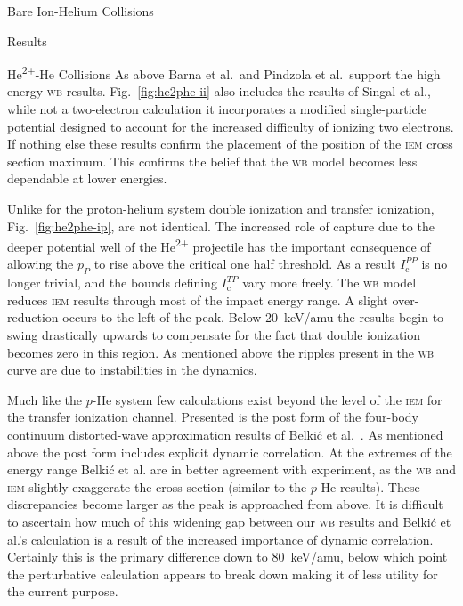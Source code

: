 \documentclass[letterpaper, 11 pt]{report}
\begin{document}
\begin{chapter}{Bare Ion-Helium Collisions \label{chap:p-he2p-he}}
\begin{section}{Results \label{sec:phe2p-res}}
\begin{subsection}{\texorpdfstring{He\textsuperscript{2+}}{He2+}-He Collisions
                         \label{sec:he2phe-res}}
         As above Barna et al.\ and Pindzola et al.\ support the high energy \textsc{wb}
         results. Fig.~\ref{fig:he2phe-ii} also includes the results of Singal et al., while
         not a two-electron calculation it incorporates a modified single-particle potential designed to
         account for the increased difficulty of ionizing two electrons. If nothing else these results
         confirm the placement of the position of the \textsc{iem} cross section maximum. This confirms
         the belief that the \textsc{wb} model becomes less dependable at lower energies.

         Unlike for the proton-helium system double ionization and transfer ionization,
         Fig.~\ref{fig:he2phe-ip}, are not identical. The increased role of capture due to the deeper
         potential well of the He\textsuperscript{2+} projectile has the important consequence of
         allowing the $p_P$ to rise above the critical one half threshold. As a result
         $I^{PP}_\mathrm{c}$ is no longer trivial, and the bounds defining $I^{TP}_\mathrm{c}$ vary more
         freely. The \textsc{wb} model reduces \textsc{iem} results through most of the impact energy
         range. A slight over-reduction occurs to the left of the peak. Below 20~keV/amu the results
         begin to swing drastically upwards to compensate for the fact that double ionization becomes
         zero in this region. As mentioned above the ripples present in the \textsc{wb} curve are due to
         instabilities in the dynamics.

         Much like the $p$-He system few calculations exist beyond the level of the \textsc{iem} for the
         transfer ionization channel. Presented is the post form of the four-body continuum
         distorted-wave  approximation results of Belki\'{c} et al.~\cite{BMM-97}. As mentioned above
         the post form includes explicit dynamic correlation. At the extremes of the energy range
         Belki\'{c} et al. are in better agreement with experiment, as the \textsc{wb} and \textsc{iem}
         slightly exaggerate the cross section (similar to the $p$-He results). These discrepancies
         become larger as the peak is approached from above. It is difficult to ascertain how much of
         this widening gap between our \textsc{wb} results and Belki\'{c} et al.'s calculation is a
         result of the increased importance of dynamic correlation. Certainly this is the primary
         difference down to 80~keV/amu, below which point the perturbative calculation appears to break
         down making it of less utility for the current purpose.


\end{subsection}
\end{section}
\end{chapter}
\end{document}
